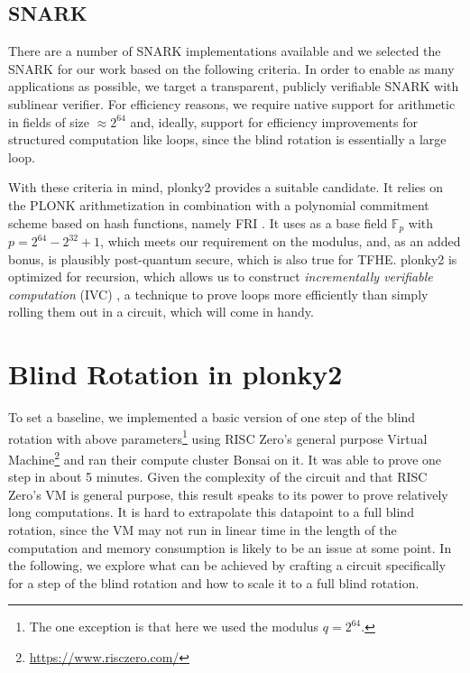\documentclass[9pt]{extarticle}
\newcommand{\field}{\mathbb{F}}
\begin{document}
\subsection{SNARK}
\label{sec:snark}
There are a number of SNARK implementations available and we selected the SNARK for our work based on the following criteria. In order to enable as many applications as possible, we target a transparent, publicly verifiable SNARK with sublinear verifier. For efficiency reasons, we require native support for arithmetic in fields of size $\approx 2^{64}$ and, ideally, support for efficiency improvements for structured computation like loops, since the blind rotation is essentially a large loop.

With these criteria in mind, plonky2 \cite{plonky2} provides a suitable candidate. It relies on the PLONK arithmetization \cite{EPRINT:GabWilCio19} in combination with a polynomial commitment scheme based on hash functions, namely FRI \cite{ICALP:BBHR18}. It uses as a base field $\field_p$ with $p = 2^{64} - 2^{32} + 1$, which meets our requirement on the modulus, and, as an added bonus, is plausibly post-quantum secure, which is also true for TFHE. plonky2 is optimized for recursion, which allows us to construct \emph{incrementally verifiable computation} (IVC) \cite{TCC:Valiant08}, a technique to prove loops more efficiently than simply rolling them out in a circuit, which will come in handy.

\section{Blind Rotation in plonky2}
\label{sec:blind}
To set a baseline, we implemented a basic version of one step of the blind rotation with above parameters\footnote{The one exception is that here we used the modulus $q=2^{64}$.} using RISC Zero's general purpose Virtual Machine\footnote{\url{https://www.risczero.com/}} and ran their compute cluster Bonsai on it. It was able to prove one step in about 5 minutes. Given the complexity of the circuit and that RISC Zero's VM is general purpose, this result speaks to its power to prove relatively long computations. It is hard to extrapolate this datapoint to a full blind rotation, since the VM may not run in linear time in the length of the computation and memory consumption is likely to be an issue at some point. In the following, we explore what can be achieved by crafting a circuit specifically for a step of the blind rotation and how to scale it to a full blind rotation.
\end{document}
